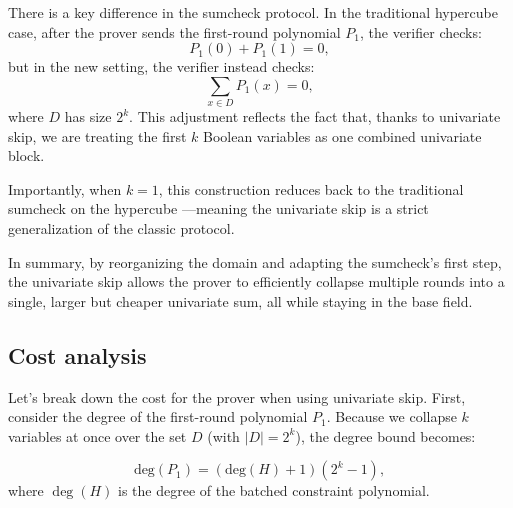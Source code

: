 \documentclass{article}
\newcommand{\Fq}{\mathbb F_q}
\begin{document}
There is a key difference in the sumcheck protocol. In the traditional hypercube case, after the prover sends the first-round polynomial $P_1$, the verifier checks:
$$
P_1(0) + P_1(1) = 0,
$$
but in the new setting, the verifier instead checks:
$$
\sum_{x \in D} P_1(x) = 0,
$$
where $D$ has size $2^k$. This adjustment reflects the fact that, thanks to univariate skip, we are treating the first $k$ Boolean variables as one combined univariate block.

Importantly, when $k = 1$, this construction reduces back to the traditional sumcheck on the hypercube —meaning the univariate skip is a strict generalization of the classic protocol.


In summary, by reorganizing the domain and adapting the sumcheck’s first step, the univariate skip allows the prover to efficiently collapse multiple rounds into a single, larger but cheaper univariate sum, all while staying in the base field.







\subsection{Cost analysis}

Let’s break down the cost for the prover when using univariate skip. First, consider the degree of the first-round polynomial $P_1$. Because we collapse $k$ variables at once over the set $D$ (with $|D| = 2^k$),
the degree bound becomes:

$$\text{deg}(P_1) = (\text{deg}(H) + 1)  (2^k - 1),$$
where $\deg(H)$ is the degree of the batched constraint polynomial.
\end{document}
